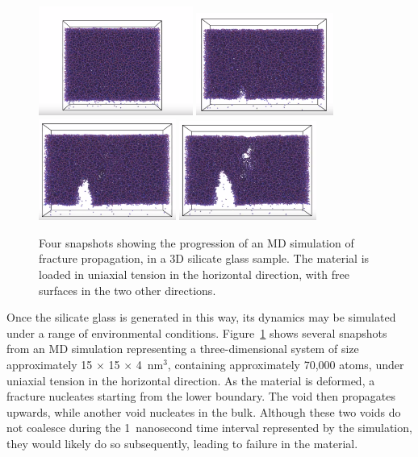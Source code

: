 \begin{figure}
    \centering
    \noindent
\includegraphics[width=0.45\textwidth]{frac_prop1.PNG}\hspace{0.15\textwidth}%
\includegraphics[width=0.4\textwidth]{frac_prop2.PNG}\\[2em]
\includegraphics[width=0.4\textwidth]{frac_prop3.PNG}\hspace{0.2\textwidth}%
\includegraphics[width=0.4\textwidth]{frac_prop4.PNG}\par
    \caption{Four snapshots showing the progression of an MD simulation of fracture propagation, in a 3D silicate glass sample. The material is loaded in uniaxial tension in the horizontal direction, with free surfaces in the two other directions.}
    \label{fig:crack_prop}
\end{figure}

Once the silicate glass is generated in this way, its dynamics may be simulated under a range of environmental conditions.  Figure~\ref{fig:crack_prop} shows several snapshots from an MD simulation representing a three-dimensional system of size approximately 15 $\times$ 15 $\times$ 4~nm$^3$, containing approximately 70,000 atoms, under uniaxial tension in the horizontal direction.  As the material is deformed, a fracture nucleates starting from the lower boundary.  The void then propagates upwards, while another void nucleates in the bulk.  Although these two voids do not coalesce during the 1~nanosecond time interval represented by the simulation, they would likely do so subsequently, leading to failure in the material.

